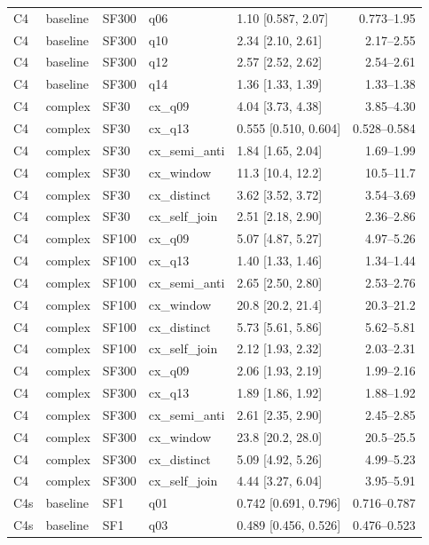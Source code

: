 \begin{longtable}{lllllr}
C4 & baseline & SF300 & q06 & 1.10 [0.587, 2.07] & 0.773--1.95 \\
C4 & baseline & SF300 & q10 & 2.34 [2.10, 2.61] & 2.17--2.55 \\
C4 & baseline & SF300 & q12 & 2.57 [2.52, 2.62] & 2.54--2.61 \\
C4 & baseline & SF300 & q14 & 1.36 [1.33, 1.39] & 1.33--1.38 \\
C4 & complex & SF30 & cx\_q09 & 4.04 [3.73, 4.38] & 3.85--4.30 \\
C4 & complex & SF30 & cx\_q13 & 0.555 [0.510, 0.604] & 0.528--0.584 \\
C4 & complex & SF30 & cx\_semi\_anti & 1.84 [1.65, 2.04] & 1.69--1.99 \\
C4 & complex & SF30 & cx\_window & 11.3 [10.4, 12.2] & 10.5--11.7 \\
C4 & complex & SF30 & cx\_distinct & 3.62 [3.52, 3.72] & 3.54--3.69 \\
C4 & complex & SF30 & cx\_self\_join & 2.51 [2.18, 2.90] & 2.36--2.86 \\
C4 & complex & SF100 & cx\_q09 & 5.07 [4.87, 5.27] & 4.97--5.26 \\
C4 & complex & SF100 & cx\_q13 & 1.40 [1.33, 1.46] & 1.34--1.44 \\
C4 & complex & SF100 & cx\_semi\_anti & 2.65 [2.50, 2.80] & 2.53--2.76 \\
C4 & complex & SF100 & cx\_window & 20.8 [20.2, 21.4] & 20.3--21.2 \\
C4 & complex & SF100 & cx\_distinct & 5.73 [5.61, 5.86] & 5.62--5.81 \\
C4 & complex & SF100 & cx\_self\_join & 2.12 [1.93, 2.32] & 2.03--2.31 \\
C4 & complex & SF300 & cx\_q09 & 2.06 [1.93, 2.19] & 1.99--2.16 \\
C4 & complex & SF300 & cx\_q13 & 1.89 [1.86, 1.92] & 1.88--1.92 \\
C4 & complex & SF300 & cx\_semi\_anti & 2.61 [2.35, 2.90] & 2.45--2.85 \\
C4 & complex & SF300 & cx\_window & 23.8 [20.2, 28.0] & 20.5--25.5 \\
C4 & complex & SF300 & cx\_distinct & 5.09 [4.92, 5.26] & 4.99--5.23 \\
C4 & complex & SF300 & cx\_self\_join & 4.44 [3.27, 6.04] & 3.95--5.91 \\
C4s & baseline & SF1 & q01 & 0.742 [0.691, 0.796] & 0.716--0.787 \\
C4s & baseline & SF1 & q03 & 0.489 [0.456, 0.526] & 0.476--0.523 \\

\end{longtable}
